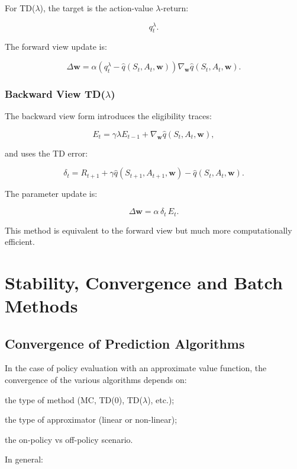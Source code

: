 For TD($\lambda$), the target is the action-value $\lambda$-return:

\[
q_t^\lambda.
\]

The forward view update is:

\[
\Delta \mathbf{w}
=
\alpha \left( q_t^\lambda - \hat{q}(S_t,A_t,\mathbf{w}) \right)
\nabla_{\mathbf{w}} \hat{q}(S_t,A_t,\mathbf{w}).
\]

\subsubsection{Backward View TD($\lambda$)}

The backward view form introduces the eligibility traces:

\[
E_t
=
\gamma \lambda E_{t-1}
+
\nabla_{\mathbf{w}} \hat{q}(S_t,A_t,\mathbf{w}),
\]

and uses the TD error:

\[
\delta_t
=
R_{t+1}
+
\gamma \hat{q}(S_{t+1},A_{t+1},\mathbf{w})
-
\hat{q}(S_t,A_t,\mathbf{w}).
\]

The parameter update is:

\[
\Delta \mathbf{w}
=
\alpha \, \delta_t \, E_t.
\]

This method is equivalent to the forward view but much more computationally efficient.

\section{Stability, Convergence and Batch Methods}

\subsection{Convergence of Prediction Algorithms}

In the case of policy evaluation with an approximate value function, the convergence of the various algorithms depends on:

\begin{compactitemize}
    \item the type of method (MC, TD(0), TD($\lambda$), etc.);
    \item the type of approximator (linear or non-linear);
    \item the on-policy vs off-policy scenario.
\end{compactitemize}

In general:

